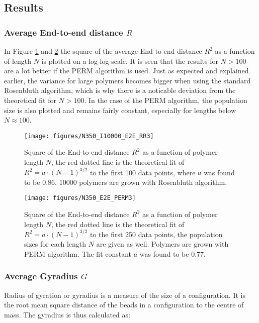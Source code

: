 \subsection*{Results}
\subsubsection*{Average End-to-end distance $R$}

In Figure \ref{fig:etoe_rr} and \ref{fig:etoe_perm} the square of the average End-to-end distance $R^2$ as a function of length $N$ is plotted on a log-log scale. It is seen that the results for $N>100$ are a lot better if the PERM algorithm is used. Just as expected and explained earlier, the variance for large polymers becomes bigger when using the standard Rosenbluth algorithm, which is why there is a noticable deviation from the theoretical fit for $N>100$. In the case of the PERM algorithm, the population size is also plotted and remains fairly constant, especially for lengths below $N \approx 100$.

\begin{figure}[ht!]
\centering
\texttt{[image: figures/N350\_I10000\_E2E\_RR3]}
\caption{Square of the End-to-end distance $R^2$ as a function of polymer length $N$, the red dotted line is the theoretical fit of $R^2=a\cdot \left(N-1\right)^{3/2}$ to the first 100 data points, where $a$ was found to be $0.86$. 10000 polymers are grown with Rosenbluth algorithm.}
\label{fig:etoe_rr}
\end{figure}

\begin{figure}[ht!]
\centering
\texttt{[image: figures/N350\_E2E\_PERM3]}
\caption{Square of the End-to-end distance $R^2$ as a function of polymer length $N$, the red dotted line is the theoretical fit of $R^2=a\cdot \left(N-1\right)^{3/2}$ to the first 250 data points, the population sizes for each length $N$ are given as well. Polymers are grown with PERM algorithm. The fit constant $a$ was found to be $0.77$.}
\label{fig:etoe_perm}
\end{figure}

\subsubsection*{Average Gyradius $G$}

Radius of gyration or gyradius is a measure of the size of a configuration. It is the root mean square distance of the beads in a configuration to the centre of mass. The gyradius is thus calculated as:

